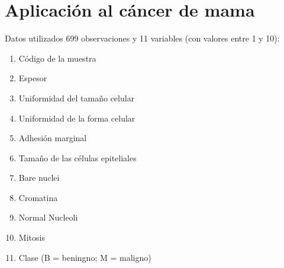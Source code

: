 \documentclass[hyperref={unicode}]{beamer}
\begin{document}
\section{Aplicación al cáncer de mama}
\begin{frame}{Datos utilizados}
	699 observaciones y 11 variables (con valores entre 1 y 10):
	\begin{enumerate}
		\item Código de la muestra
		\item Espesor
		\item Uniformidad del tamaño celular
		\item Uniformidad de la forma celular
		\item Adhesión marginal
		\item Tamaño de las células epiteliales
		\item Bare nuclei
		\item Cromatina
		\item Normal Nucleoli
		\item Mitosis
		\item Clase (B = beningno; M = maligno)
	\end{enumerate}
\end{frame}
\end{document}
